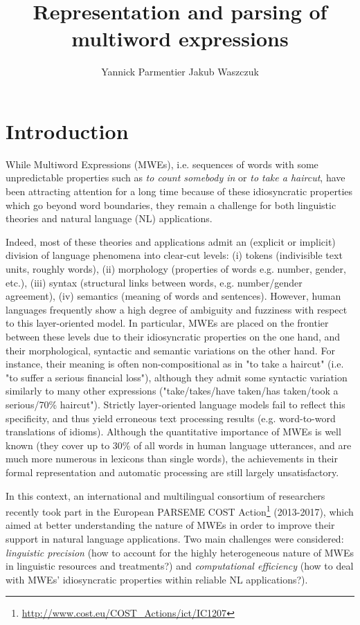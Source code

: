 \documentclass[output=paper]{langsci/langscibook}
\title{Representation and parsing of multiword expressions}
\author{%
 Yannick Parmentier\affiliation{Université d'Orléans}\lastand 
 Jakub Waszczuk\affiliation{Université François Rabelais Tours\\Université d'Orléans}
}
\begin{document}
\section{Introduction} 
While Multiword Expressions (MWEs), i.e. sequences of words with some
unpredictable properties such as \textit{to count somebody in} or
\textit{to take a haircut}, have been attracting attention for a long
time because of these idiosyncratic properties which go beyond word
boundaries, they remain a challenge for both linguistic theories and
natural language (NL) applications.

Indeed, most of these theories and applications admit an (explicit or
implicit) division of language phenomena into clear-cut levels:
(i) tokens (indivisible text units, roughly words),
(ii) morphology (properties of words e.g. number, gender, etc.),
(iii) syntax (structural links between words, e.g. number/gender agreement),
(iv) semantics (meaning of words and sentences).
However, human languages frequently show a high degree of ambiguity
and fuzziness with respect to this layer-oriented model. In
particular, MWEs are placed on the frontier between these levels due
to their idiosyncratic properties on the one hand, and their
morphological, syntactic and semantic variations on the other
hand. For instance, their meaning is often non-compositional as in "to
take a haircut" (i.e. "to suffer a serious financial loss"), although
they admit some syntactic variation similarly to many other
expressions ("take/takes/have taken/has taken/took a serious/70\%
haircut"). Strictly layer-oriented language models fail to reflect
this specificity, and thus yield erroneous text processing results
(e.g. word-to-word translations of idioms). Although the quantitative
importance of MWEs is well known (they cover up to 30\% of all words
in human language utterances, and are much more numerous in lexicons
than single words), the achievements in their formal representation
and automatic processing are still largely unsatisfactory.

In this context, an international and multilingual consortium of
researchers recently took part in the European PARSEME COST
Action\footnote{\url{http://www.cost.eu/COST_Actions/ict/IC1207}}
(2013-2017), which aimed at better understanding the nature of MWEs in
order to improve their support in natural language applications. Two
main challenges were considered: \emph{linguistic precision} (how to
account for the highly heterogeneous nature of MWEs in linguistic
resources and treatments?) and \emph{computational efficiency} (how to
deal with MWEs' idiosyncratic properties within reliable NL
applications?).
\end{document}
